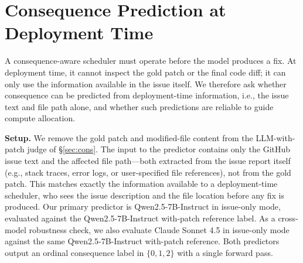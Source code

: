 \documentclass{article}
\begin{document}
\begin{table}[h]
\centering
{}
\caption{\textbf{Model audit on SWE-bench Lite.} We report sample size $n$,
configured token budget $\mathrm{max\_new}$, Spearman rank correlation
between thinking length and consequence, $p$-value, average difference
in thinking length between high- and low-consequence tasks, and the
observed failure mode relative to the cost-weighted allocation objective.}
\label{tab:audit}
\end{table}

\section{Consequence Prediction at Deployment Time}
\label{sec:pred}

A consequence-aware scheduler must operate before the model produces a
fix. At deployment time, it cannot inspect the gold patch or the final
code diff; it can only use the information available in the issue
itself. We therefore ask whether consequence can be predicted from deployment-time
information, i.e., the
issue text and file path alone, and whether such predictions are reliable to guide compute allocation.

\textbf{Setup.} We remove the gold patch and modified-file content from the LLM-with-patch judge of \S\ref{sec:cons}. The input to the predictor contains only the GitHub issue text and the affected file path—both extracted from the issue report itself (e.g., stack traces, error logs, or user-specified file references), not from the gold patch. This matches exactly the information available to a deployment-time scheduler, who sees the issue description and the file location before any fix is produced.
Our primary predictor is Qwen2.5-7B-Instruct in issue-only mode, evaluated against the Qwen2.5-7B-Instruct with-patch reference label. As a cross-model robustness check, we also evaluate Claude Sonnet 4.5 in
issue-only mode against the same Qwen2.5-7B-Instruct with-patch reference. Both predictors output an ordinal consequence label in $\{0,1,2\}$ with a single forward pass.
\end{document}
